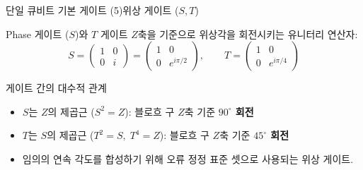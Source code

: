 \documentclass[aspectratio=169, 10pt]{beamer}
\begin{document}
\begin{frame}{단일 큐비트 기본 게이트 (5)}{위상 게이트 ($S, T$)}
    \begin{block}{Phase 게이트 ($S$)와 $T$ 게이트}
        $Z$축을 기준으로 위상각을 회전시키는 유니터리 연산자:
        $$S = \begin{pmatrix} 1 & 0 \\ 0 & i \end{pmatrix} = \begin{pmatrix} 1 & 0 \\ 0 & e^{i\pi/2} \end{pmatrix}, \qquad T = \begin{pmatrix} 1 & 0 \\ 0 & e^{i\pi/4} \end{pmatrix}$$
    \end{block} \pause
    \vspace{0.15cm}
    \begin{exampleblock}{게이트 간의 대수적 관계}
        \begin{itemize}
            \item $S$는 $Z$의 제곱근 ($S^2 = Z$): 블로흐 구 $Z$축 기준 \textbf{$90^\circ$ 회전} \pause
            \item $T$는 $S$의 제곱근 ($T^2 = S, \; T^4 = Z$): 블로흐 구 $Z$축 기준 \textbf{$45^\circ$ 회전} \pause
            \item 임의의 연속 각도를 합성하기 위해 오류 정정 표준 셋으로 사용되는 위상 게이트.
        \end{itemize}
    \end{exampleblock}
\end{frame}
\end{document}
